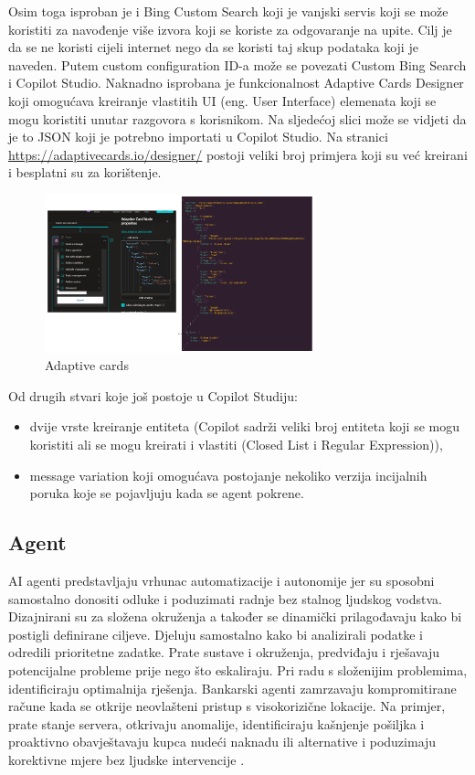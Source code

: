 \documentclass[]{foi}
\begin{document}
Osim toga isproban je i Bing Custom Search koji je vanjski servis koji se može koristiti za navođenje više izvora koji se koriste za odgovaranje na upite. Cilj je da se ne koristi cijeli
internet nego da se koristi taj skup podataka koji je naveden. Putem custom configuration ID-a može se povezati Custom Bing Search i Copilot Studio.
Naknadno isprobana je funkcionalnost Adaptive Cards Designer koji omogućava kreiranje vlastitih UI (eng. User Interface) elemenata koji se mogu koristiti unutar razgovora s korisnikom. 
Na sljedećoj slici može se vidjeti da je to JSON koji je potrebno importati u Copilot Studio. Na stranici \underline{https://adaptivecards.io/designer/} postoji veliki broj 
primjera koji su već kreirani i besplatni su za korištenje.

\begin{figure}[ht!]
    \centering
    \includegraphics[width=0.7\textwidth]{./assets/Adaptive_cards.png} 
    \caption{Adaptive cards}
    \label{fig:slika3}
\end{figure}

Od drugih stvari koje još postoje u Copilot Studiju:
\begin{itemize}
\item dvije vrste kreiranje entiteta (Copilot sadrži veliki broj entiteta koji se mogu koristiti ali se mogu kreirati i vlastiti (Closed List i Regular Expression)),
\item message variation koji omogućava postojanje nekoliko verzija incijalnih poruka koje se pojavljuju kada se agent pokrene. 
\end{itemize}

\subsection{Agent}

AI agenti predstavljaju vrhunac automatizacije i autonomije jer su sposobni samostalno donositi odluke i poduzimati radnje bez stalnog ljudskog vodstva. Dizajnirani su za složena okruženja a 
također se dinamički prilagođavaju kako bi postigli definirane ciljeve. Djeluju samostalno kako bi analizirali podatke i odredili prioritetne zadatke. Prate sustave i okruženja, predviđaju i rješavaju 
potencijalne probleme prije nego što eskaliraju. Pri radu s složenijim problemima, identificiraju optimalnija rješenja. Bankarski agenti zamrzavaju kompromitirane račune kada se otkrije neovlašteni pristup s visokorizične lokacije.
Na primjer, prate stanje servera, otkrivaju anomalije, identificiraju kašnjenje pošiljka i proaktivno obavještavaju kupca nudeći naknadu ili alternative i poduzimaju korektivne mjere bez ljudske intervencije \cite{exomindset2025difference}.
\end{document}
